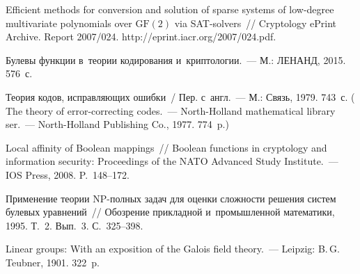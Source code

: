 \begin{multicols}{2}
{{\begin{thebibliography}{99}
        {Efficient methods for conversion and solution of sparse systems of 
        low-degree multivariate polynomials over $\mathrm{GF}(2)$ via SAT-solvers}~//
        Cryptology ePrint Archive. Report 2007/024.
        {\sf http://eprint.iacr.org/2007/024.pdf}.

        Булевы функции в~теории кодирования и~крип\-то\-ло\-гии.~---
        М.: ЛЕНАНД, 2015. 576~с.

        Теория кодов, исправляющих ошибки~/ Пер. с~англ.~---
        М.: Связь, 1979. 743~с.
        ( The theory of 
        error-correcting codes.~--- 
        North-Holland mathematical library ser.~---
        North-Holland Publishing Co., 1977.  774~p.)

        {Local affinity of Boolean mappings}~//
        Boolean functions in cryptology and information security: Proceedings of the 
NATO Advanced Study Institute.~---
        IOS Press, 2008. P.~148--172.

        {Применение теории NP-пол\-ных задач для оценки сложности решения систем 
булевых уравнений}~//
        Обозрение прикладной и~промышленной математики, 1995. Т.~2. Вып.~3. 
С.~325--398.

        Linear groups: With an exposition of the Galois field theory.~---
        Leipzig: B.\,G.\,Teubner, 1901. 322~p.




\end{thebibliography} 
 }
 }

\end{multicols}

